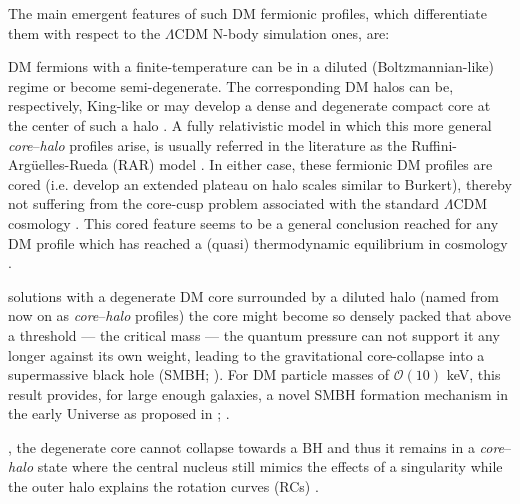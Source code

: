 The main emergent features of such DM fermionic profiles, which differentiate them with respect to the $\Lambda$CDM N-body simulation ones, are: 
%
\begin{asparaenum}[(i)]
    \item DM fermions with a finite-temperature can be in a diluted (Boltzmannian-like) regime or become semi-degenerate. The corresponding DM halos can be, respectively, King-like or may develop a dense and degenerate compact core at the center of such a halo \citep{2015PhRvD..92l3527C,2021MNRAS.502.4227A}. A fully relativistic model in which this more general \textit{core}--\textit{halo} profiles arise, is usually referred in the literature as the Ruffini-Argüelles-Rueda (RAR) model \citep{2015MNRAS.451..622R,2018PDU....21...82A,2019PDU....24..278A,2020A&A...641A..34B,2021MNRAS.505L..64B,2021MNRAS.502.4227A,2022IJMPD..3130002A,2022MNRAS.511L..35A}. In either case, these fermionic DM profiles are cored (i.e. develop an extended plateau on halo scales similar to Burkert), thereby not suffering from the core-cusp problem associated with the standard $\Lambda$CDM cosmology \citep{2017ARA&A..55..343B}. This cored feature seems to be a general conclusion reached for any DM profile which has reached a (quasi) thermodynamic equilibrium in cosmology \citep{2021MNRAS.504.2832S}.

    \item {} solutions with a degenerate DM core surrounded by a diluted halo (named from now on as \textit{core}--\textit{halo} profiles)  the core might become so densely packed that above a threshold --- the critical mass --- the quantum pressure can not support it any longer against its own weight, leading to the gravitational core-collapse into a supermassive black hole (SMBH;  \citealp{2020EPJB...93..208A,2021MNRAS.502.4227A}). For DM particle masses of $\mathcal{O}(10)$ keV, this result provides, for large enough galaxies, a novel SMBH formation mechanism in the early Universe as proposed in \citet{2021MNRAS.502.4227A}; .

    \item {}, the degenerate core cannot collapse towards a BH  and thus it remains in a \textit{core}--\textit{halo} state where the central nucleus still mimics the effects of a singularity  while the outer halo explains the rotation curves (RCs) \citep{2019PDU....24..278A,2021MNRAS.502.4227A,2022IJMPD..3130002A}.
    

\end{asparaenum}
